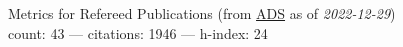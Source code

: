 Metrics for Refereed Publications (from \href{\adsurl}{ADS} as of \textit{2022-12-29}) \\count: 43 --- citations: 1946 --- h-index: 24
